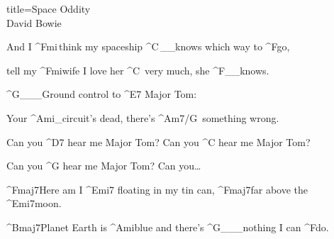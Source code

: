 \begin{song}{title=\predtitle\centering Space Oddity \\\large David Bowie  \vspace*{-0.3cm}}
\begin{centerjustified}
	And I ^{Fmi\,}think my spaceship ^{C\,{\color{white}\_\_}}knows which way to ^{F}go, 

	tell my ^{Fmi}wife I love her ^{C\,\,\,}very much, she ^{F{\color{white}\_\_}}knows.

	^{G{\color{white}\_\_\_}}Ground control to ^{E7\,\,}Major Tom: 

	Your ^{Ami{\color{white}\_}}circuit's dead, there's ^{Am7/G\,\,\,}something wrong.

	Can you ^{D7\,\,}hear me Major Tom? Can you ^{C\,\,}hear me Major Tom? 

	Can you ^{G\,\,}hear me Major Tom? Can you\dots

	^{Fmaj7}Here am I ^{Emi7\,\,}floating in my tin can, ^{Fmaj7}far above the ^{Emi7}moon.

	^{Bmaj7}Planet Earth is ^{Ami}blue and there's ^{G{\color{white}\_\_\_}}nothing I can ^{F}do.


\end{centerjustified}
\setcounter{Slokočet}{0}
\end{song}
